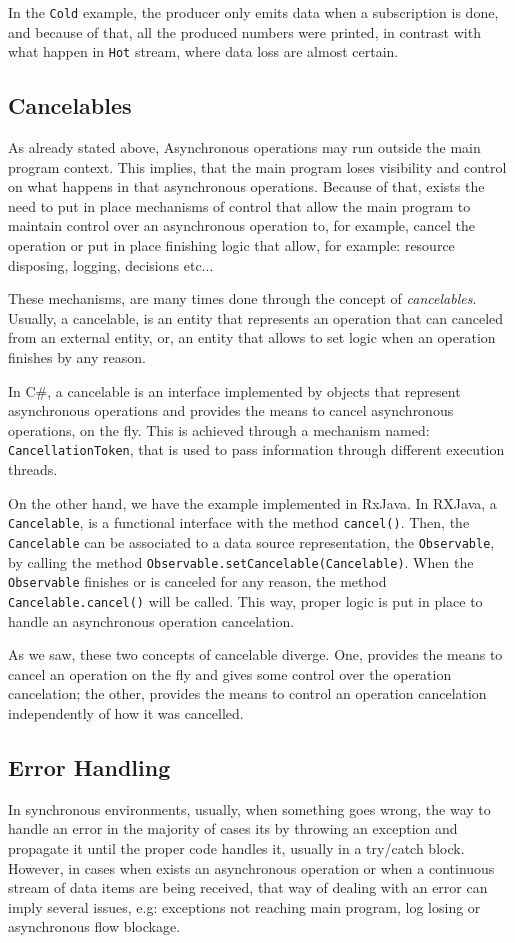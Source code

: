 	In the \texttt{Cold} example, the producer only emits data when a subscription is done, and because of that, all the produced numbers were printed, in contrast with what happen in \texttt{Hot} stream, where data loss are almost certain. 
	\clearpage
	\subsection{Cancelables} 
	As already stated above, Asynchronous operations may run outside the main program context. 
	This implies, that the main program loses visibility and control on what happens in that asynchronous operations.
	Because of that, exists the need to put in place mechanisms of control that allow the main program to maintain control over an asynchronous operation to, for example, cancel the operation or put in place finishing logic that allow, for example: resource disposing, logging, decisions etc...

	These mechanisms, are many times done through the concept of \textit{cancelables}. 
	Usually, a cancelable, is an entity that represents an operation that can canceled from an external entity, or, an entity that allows to set logic when an operation finishes by any reason.
 
	In C\#, a cancelable is an interface implemented by objects that represent asynchronous operations and provides the means to cancel asynchronous operations, on the fly. 
	This is achieved through a mechanism named: \texttt{CancellationToken}, that is used to pass information through different execution threads. 
	
	On the other hand, we have the example implemented in RxJava. 
	In RXJava, a \texttt{Cancelable}, is a functional interface with the method \texttt{cancel()}. Then, the \texttt{Cancelable} can be associated to a data source representation, the \texttt{Observable}, by calling the method \texttt{Observable.setCancelable(Cancelable)}. 
	When the \texttt{Observable} finishes or is canceled for any reason, the method \texttt{Cancelable.cancel()} will be called. 
	This way,  proper logic is put in place to handle an asynchronous operation cancelation.
	
	As we saw, these two concepts of cancelable diverge. One, provides the means to cancel an operation on the fly and gives some control over the operation cancelation; the other, provides the means to control an operation cancelation independently of how it was cancelled.
	
	\clearpage
	\subsection{Error Handling}  
	In synchronous environments, usually, when something goes wrong, the way to handle an error in the majority of cases its by throwing an exception and propagate it until the proper code handles it, usually  in a try/catch block. 
	However, in cases when exists an asynchronous operation or when a continuous stream of data items are being received, that way of dealing with an error can imply several issues, e.g: exceptions not reaching main program, log losing or asynchronous flow blockage. 
	
